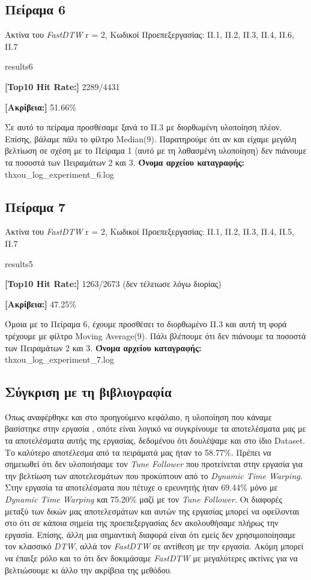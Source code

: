 \subsection{Πείραμα 6}
Ακτίνα του \textit{FastDTW} r = 2, Κωδικοί Προεπεξεργασίας: Π.1, Π.2, Π.3, Π.4, Π.6, Π.7
\begin{labeling}{results6}
  \item \textbf{[Top10 Hit Rate:]} 2289/4431
  \item \textbf{[Ακρίβεια:]} 51.66\%
\end{labeling}
Σε αυτό το πείραμα προσθέσαμε ξανά το Π.3 με διορθωμένη υλοποίηση πλέον. Επίσης, βάλαμε πάλι το φίλτρο Μedian(9). Παρατηρούμε ότι αν και είχαμε μεγάλη βελτίωση σε σχέση με το Πείραμα 1 (αυτό με τη λαθασμένη υλοποίηση) δεν πιάνουμε τα ποσοστά των Πειραμάτων 2 και 3.
\textbf{Όνομα αρχείου καταγραφής:} thxou\_log\_experiment\_6.log

\subsection{Πείραμα 7}
Ακτίνα του \textit{FastDTW} r = 2, Κωδικοί Προεπεξεργασίας: Π.1, Π.2, Π.3, Π.4, Π.5, Π.7
\begin{labeling}{results5}
  \item \textbf{[Top10 Hit Rate:]} 1263/2673 (δεν τέλειωσε λόγω διορίας)
  \item \textbf{[Ακρίβεια:]} 47.25\%
\end{labeling}
Όμοια με το Πείραμα 6, έχουμε προσθέσει το διορθωμένο Π.3 και αυτή τη φορά τρέχουμε με φίλτρο Moving Average(9). Πάλι βλέπουμε ότι δεν πιάνουμε τα ποσοστά των Πειραμάτων 2 και 3.
\textbf{Όνομα αρχείου καταγραφής:} thxou\_log\_experiment\_7.log

\subsection{Σύγκριση με τη βιβλιογραφία}
Όπως αναφέρθηκε και στο προηγούμενο κεφάλαιο, η υλοποίηση που κάναμε βασίστηκε στην εργασία \cite{stasiak2014follow}, οπότε είναι λογικό να συγκρίνουμε τα αποτελέσματα μας με τα αποτελέσματα αυτής της 
εργασίας, δεδομένου ότι δουλέψαμε και στο ίδιο Dataset. Το καλύτερο αποτέλεσμα από τα πειράματά μας ήταν το
58.77\%. Πρέπει να σημειωθεί ότι δεν υλοποιήσαμε τον \textit{Tune Follower} που προτείνεται στην εργασία για την 
βελτίωση των αποτελεσμάτων που προκύπτουν από το \textit{Dynamic Time Warping}. Στην εργασία τα αποτελέσματα που πέτυχε
ο ερευνητής ήταν 69.44\% μόνο με \textit{Dynamic Time Warping} και 75.20\% μαζί με τον \textit{Tune Follower}. Οι διαφορές 
μεταξύ των δικών μας αποτελεσμάτων και αυτών της εργασίας μπορεί να οφείλονται στο ότι σε κάποια σημεία της 
προεπεξεργασίας δεν ακολουθήσαμε πλήρως την εργασία. Επίσης, άλλη μια σημαντική 
διαφορά είναι ότι εμείς δεν χρησιμοποίησαμε τον κλασσικό \textit{DTW}, αλλά τον \textit{FastDTW} σε αντίθεση με την εργασία. 
Ακόμη μπορεί να έπαιξε ρόλο και το ότι δεν δοκιμάσαμε \textit{FastDTW} με μεγαλύτερες ακτίνες για να βελτιώσουμε κι άλλο την ακρίβεια της μεθόδου. 